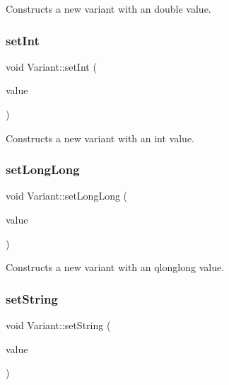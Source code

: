 Constructs a new variant with an double value. 

\mbox{\label{class_variant_aa4fe139cfa2b949c68fd2cc61118dd12}} 
\subsubsection{\texorpdfstring{set\+Int}{setInt}}
{\footnotesize\ttfamily void Variant\+::set\+Int (\begin{DoxyParamCaption}\item[{int}]{value }\end{DoxyParamCaption})\hspace{0.3cm}{\ttfamily [slot]}}



Constructs a new variant with an int value. 

\mbox{\label{class_variant_a71259193b1023a8ef4761cc92b4c96b4}} 
\subsubsection{\texorpdfstring{set\+Long\+Long}{setLongLong}}
{\footnotesize\ttfamily void Variant\+::set\+Long\+Long (\begin{DoxyParamCaption}\item[{qlonglong}]{value }\end{DoxyParamCaption})\hspace{0.3cm}{\ttfamily [slot]}}



Constructs a new variant with an qlonglong value. 

\mbox{\label{class_variant_a16fb274754b40796aa8341456c53d53c}} 
\subsubsection{\texorpdfstring{set\+String}{setString}}
{\footnotesize\ttfamily void Variant\+::set\+String (\begin{DoxyParamCaption}\item[{const Q\+String \&}]{value }\end{DoxyParamCaption})\hspace{0.3cm}{\ttfamily [slot]}}



